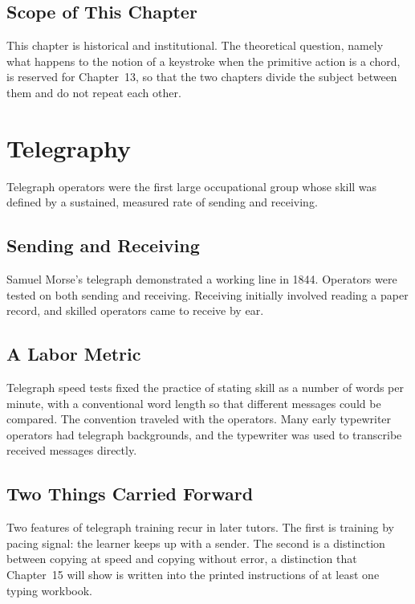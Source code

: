 \section{Scope of This Chapter}

This chapter is historical and institutional. The theoretical question, namely what happens to the notion of a keystroke when the primitive action is a chord, is reserved for Chapter~13, so that the two chapters divide the subject between them and do not repeat each other.

\chapter{Telegraphy}

Telegraph operators were the first large occupational group whose skill was defined by a sustained, measured rate of sending and receiving.

\section{Sending and Receiving}

Samuel Morse's telegraph demonstrated a working line in 1844.  Operators were tested on both sending and receiving. Receiving initially involved reading a paper record, and skilled operators came to receive by ear.

\section{A Labor Metric}

Telegraph speed tests fixed the practice of stating skill as a number of words per minute, with a conventional word length so that different messages could be compared. The convention traveled with the operators. Many early typewriter operators had telegraph backgrounds, and the typewriter was used to transcribe received messages directly. 

\section{Two Things Carried Forward}

Two features of telegraph training recur in later tutors. The first is training by pacing signal: the learner keeps up with a sender. The second is a distinction between copying at speed and copying without error, a distinction that Chapter~15 will show is written into the printed instructions of at least one typing workbook.

